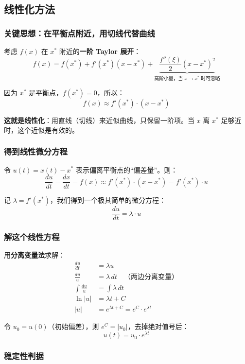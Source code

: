\documentclass[12pt,a4paper]{article}
\begin{document}
\subsection{线性化方法}

\subsubsection*{关键思想：在平衡点附近，用切线代替曲线}

考虑 $f(x)$ 在 $x^*$ 附近的\textbf{一阶 Taylor 展开}：
\[
f(x) = f(x^*) + f'(x^*)(x - x^*) + \underbrace{\frac{f''(\xi)}{2}(x - x^*)^2}_{\text{高阶小量，当 } x \to x^* \text{ 时可忽略}}
\]

因为 $x^*$ 是平衡点，$f(x^*) = 0$，所以：
\[
f(x) \approx f'(x^*) \cdot (x - x^*)
\]

\textbf{这就是线性化}：用直线（切线）来近似曲线，只保留一阶项。当 $x$ 离 $x^*$ 足够近时，这个近似是有效的。

\subsubsection*{得到线性微分方程}

令 $u(t) = x(t) - x^*$ 表示偏离平衡点的``偏差量''。则：
\[
\frac{du}{dt} = \frac{dx}{dt} = f(x) \approx f'(x^*) \cdot (x - x^*) = f'(x^*) \cdot u
\]

记 $\lambda = f'(x^*)$，我们得到一个极其简单的微分方程：
\[
\boxed{\frac{du}{dt} = \lambda \cdot u}
\]

\subsubsection*{解这个线性方程}

用\textbf{分离变量法}求解：
\begin{align*}
\frac{du}{dt} &= \lambda u \\
\frac{du}{u} &= \lambda \, dt \quad \text{（两边分离变量）}\\
\int \frac{du}{u} &= \int \lambda \, dt \\
\ln|u| &= \lambda t + C \\
|u| &= e^{\lambda t + C} = e^C \cdot e^{\lambda t}
\end{align*}

令 $u_0 = u(0)$（初始偏差），则 $e^C = |u_0|$，去掉绝对值号后：
\[
\boxed{u(t) = u_0 \cdot e^{\lambda t}}
\]

\subsubsection*{稳定性判据}
\end{document}
